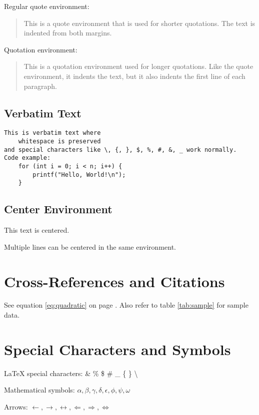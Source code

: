 \documentclass[12pt,a4paper,twoside]{article}
\begin{document}
Regular quote environment:
\begin{quote}
This is a quote environment that is used for shorter quotations. The text is indented from both margins.
\end{quote}

Quotation environment:
\begin{quotation}
This is a quotation environment used for longer quotations. Like the quote environment, it indents the text, but it also indents the first line of each paragraph.
\end{quotation}

\subsection{Verbatim Text}

\begin{verbatim}
This is verbatim text where
    whitespace is preserved
and special characters like \, {, }, $, %, #, &, _ work normally.
Code example:
    for (int i = 0; i < n; i++) {
        printf("Hello, World!\n");
    }
\end{verbatim}

\subsection{Center Environment}

\begin{center}
This text is centered.

Multiple lines can be centered
in the same environment.
\end{center}

\section{Cross-References and Citations}

See equation \ref{eq:quadratic} on page \pageref{eq:quadratic}.
Also refer to table \ref{tab:sample} for sample data.

\section{Special Characters and Symbols}

LaTeX special characters: \& \% \$ \# \_ \{ \} \textbackslash

Mathematical symbols: $\alpha, \beta, \gamma, \delta, \epsilon, \phi, \psi, \omega$

Arrows: $\leftarrow, \rightarrow, \leftrightarrow, \Leftarrow, \Rightarrow, \Leftrightarrow$
\end{document}
